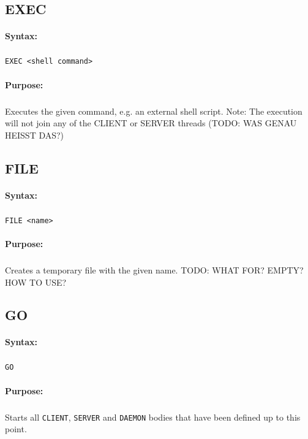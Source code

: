 \subsection{EXEC}

\paragraph{Syntax:}
\subparagraph{}
\texttt{EXEC <shell command>}

\paragraph{Purpose:}
\subparagraph{}
Executes the given command, e.g. an external shell script. Note: The 
execution will not join any of the CLIENT or SERVER threads (TODO: WAS 
GENAU HEISST DAS?)


\subsection{FILE}

\paragraph{Syntax:}
\subparagraph{}
\texttt{FILE <name>}

\paragraph{Purpose:}
\subparagraph{}
Creates a temporary file with the given name. TODO: WHAT FOR? EMPTY? HOW TO USE?


\subsection{GO}

\paragraph{Syntax:}
\subparagraph{}
\texttt{GO}

\paragraph{Purpose:}
\subparagraph{}
Starts all \texttt{CLIENT}, \texttt{SERVER} and \texttt{DAEMON} bodies that 
have been defined up to this point. 

